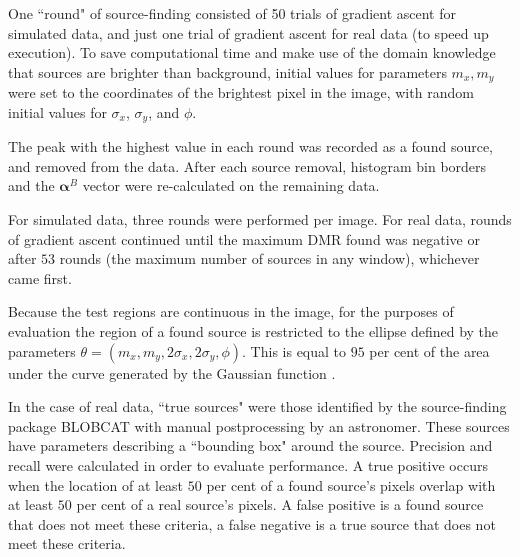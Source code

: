 \documentclass[
    ,final            %
  ]
  {aipproc}
\begin{document}
One ``round" of source-finding consisted of 50 trials of gradient ascent for simulated data, and just one trial of gradient ascent for real data (to speed up execution). To save computational time and make use of the domain knowledge that sources are brighter than background, initial values for parameters $m_x, m_y$ were set to the coordinates of the brightest pixel in the image, with random initial values for $\sigma_x$, $\sigma_y$, and $\phi$.

The peak with the highest value in each round was recorded as a found source, and removed from the data. After each source removal, histogram bin borders and the $\boldsymbol{\alpha}^B$ vector were re-calculated on the remaining data. 

For simulated data, three rounds were performed per image. For real data, rounds of gradient ascent continued until the maximum DMR found was negative
or after $53$ rounds (the maximum number of sources in any window), whichever came first.

Because the test regions are continuous in the image, for the purposes of evaluation the region of a found source is restricted to the ellipse defined by the parameters $\theta = (m_x, m_y, 2\sigma_x, 2\sigma_y, \phi)$. This is equal to $95$ per cent of the area under the curve generated by the Gaussian function \cite{wasserman2004all}.

In the case of real data, ``true sources" were those identified by the source-finding package BLOBCAT \cite{hales2012blobcat} with manual postprocessing by an astronomer. These sources have parameters describing a ``bounding box" around the source. Precision and recall \cite{olson2008advanced} were calculated in order to evaluate performance. %
A true positive occurs when the location of at least $50$ per cent of a found source's pixels overlap with at least $50$ per cent of a real source's pixels. A false positive is a found source that does not meet these criteria, a false negative is a true source that does not meet these criteria. 
\end{document}
